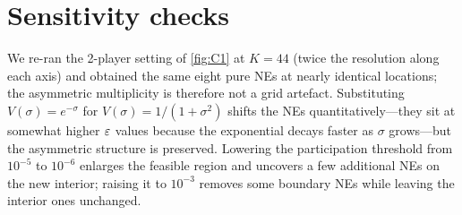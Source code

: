 \section{Sensitivity checks}
\label{app:sensitivity}

We re-ran the 2-player setting of \cref{fig:C1} at $K = 44$ (twice the
resolution along each axis) and obtained the same eight pure NEs at
nearly identical locations; the asymmetric multiplicity is therefore not
a grid artefact. Substituting $V(\sigma) = e^{-\sigma}$ for $V(\sigma) =
1/(1+\sigma^2)$ shifts the NEs quantitatively---they sit at somewhat
higher $\varepsilon$ values because the exponential decays faster as $\sigma$
grows---but the asymmetric structure is preserved. Lowering the
participation threshold from $10^{-5}$ to $10^{-6}$ enlarges the feasible
region and uncovers a few additional NEs on the new interior; raising
it to $10^{-3}$ removes some boundary NEs while leaving the
interior ones unchanged.

